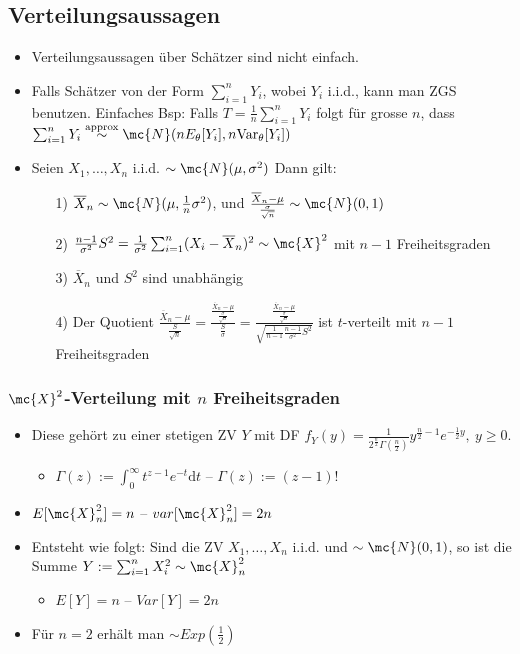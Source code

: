 \subsection{Verteilungsaussagen}
\begin{itemize}
    \item Verteilungsaussagen über Schätzer sind nicht einfach.
    \item Falls Schätzer von der Form $\sum_{i=1}^{n} Y_i$, wobei $Y_i$ i.i.d., kann man ZGS benutzen. Einfaches Bsp: Falls $T = \frac{1}{n} \sum_{i=1}^{n} Y_i$ folgt für grosse $n$, dass $\sum_{i=1}^{n} Y_i \overset{\text{approx}}{\sim} \mc{N}(n E_\theta[Y_i], n \text{Var}_\theta[Y_i])$
    \item Seien $X_1, \dots, X_n$ i.i.d. $\sim \mc{N}(\mu, \sigma^2)$ Dann gilt:
        \begin{itemize}
            \item[1)] $\overline{X}_n \sim \mc{N}(\mu, \frac{1}{n} \sigma^2)$, und $\frac{\overline{X}_n - \mu}{\frac{\sigma}{\sqrt{n}}} \sim \mc{N}(0, 1)$
            \item[2)] $\frac{n - 1}{\sigma^2}S^2 = \frac{1}{\sigma^2}\sum_{i=1}^{n} (X_i - \overline{X}_n)^2 \sim \mc{X}^2$ mit $n - 1$ Freiheitsgraden
            \item[3)] $\overline{X}_n$ und $S^2$ sind unabhängig
            \item[4)] Der Quotient $\frac{\overline{X}_n - \mu}{\frac{S}{\sqrt{n}}} = \frac{\frac{\overline{X}_n - \mu}{\frac{\sigma}{\sqrt{n}}}}{\frac{S}{\sigma}} = \frac{\frac{\overline{X}_n - \mu}{\frac{\sigma}{\sqrt{n}}}}{\sqrt{\frac{1}{n - 1}\frac{n - 1}{\sigma^2}S^2}}$ ist $t$-verteilt mit $n - 1$ Freiheitsgraden
        \end{itemize}
\end{itemize}

\subsubsection{$\mc{X}^2$-Verteilung mit $n$ Freiheitsgraden}
\begin{itemize}
    \item Diese gehört zu einer stetigen ZV $Y$ mit DF $f_Y(y) = \frac{1}{2^{\frac{n}{2}} \Gamma(\frac{n}{2})}y^{\frac{n}{2} - 1}e^{-\frac{1}{2}y}, \ y \ge 0$.
        \begin{itemize}
            \item $\Gamma(z) := \int_{0}^{\infty} t^{z - 1} e^{-t}\mathrm{d}t$  \quad -- $\Gamma(z) := (z - 1)!$
        \end{itemize}
    \item $E[\mc{X}_n^2] = n$ \quad -- $var[\mc{X}_n^2] = 2n$
    \item Entsteht wie folgt: Sind die ZV $X_1, \dots, X_n$ i.i.d. und $\sim \mc{N}(0, 1)$, so ist die Summe $Y := \sum_{i=1}^{n} X_i^2 \sim \mc{X}_n^2$
        \begin{itemize}
            \item $E[Y] = n$ \quad -- $Var[Y] = 2n$
        \end{itemize}
    \item Für $n = 2$ erhält man $\sim Exp(\frac{1}{2})$
\end{itemize}

